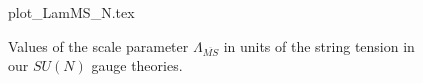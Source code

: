\documentclass[12pt]{article}
\begin{document}







\begin{figure}[htb]
\begin	{center}
\leavevmode
	{plot_LamMS_N.tex}
\end	{center}
\caption{Values of the scale parameter $\Lambda_{\overline{MS}}$
  in units of the string tension in our $SU(N)$ gauge theories.}
\label{fig_LamMS_N}
\end{figure}



\clearpage



\end{document}
